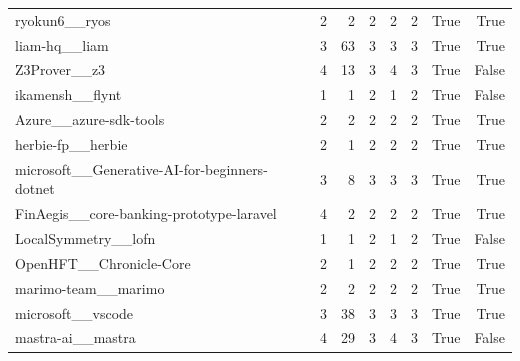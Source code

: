 \begin{table}[t]
\begin{tabular}{lrrrrrrr}
ryokun6\_\_ryos & 2 & 2 & 2 & 2 & 2 & True & True \\
liam-hq\_\_liam & 3 & 63 & 3 & 3 & 3 & True & True \\
Z3Prover\_\_z3 & 4 & 13 & 3 & 4 & 3 & True & False \\
ikamensh\_\_flynt & 1 & 1 & 2 & 1 & 2 & True & False \\
Azure\_\_azure-sdk-tools & 2 & 2 & 2 & 2 & 2 & True & True \\
herbie-fp\_\_herbie & 2 & 1 & 2 & 2 & 2 & True & True \\
microsoft\_\_Generative-AI-for-beginners-dotnet & 3 & 8 & 3 & 3 & 3 & True & True \\
FinAegis\_\_core-banking-prototype-laravel & 4 & 2 & 2 & 2 & 2 & True & True \\
LocalSymmetry\_\_lofn & 1 & 1 & 2 & 1 & 2 & True & False \\
OpenHFT\_\_Chronicle-Core & 2 & 1 & 2 & 2 & 2 & True & True \\
marimo-team\_\_marimo & 2 & 2 & 2 & 2 & 2 & True & True \\
microsoft\_\_vscode & 3 & 38 & 3 & 3 & 3 & True & True \\
mastra-ai\_\_mastra & 4 & 29 & 3 & 4 & 3 & True & False \\
\bottomrule
\end{tabular}
\end{table}
